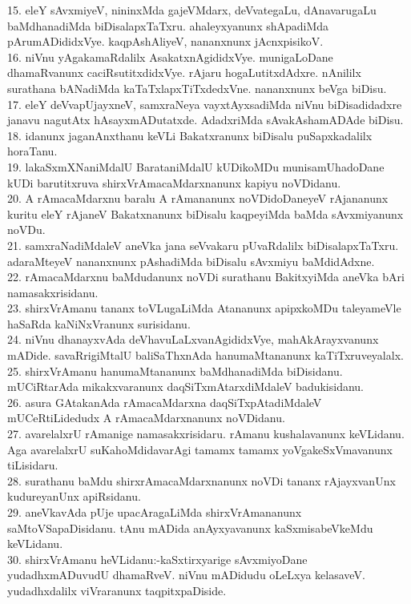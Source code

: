 \documentclass{article}
\begin{document}
15. eleY sAvxmiyeV, nininxMda gajeVMdarx, deVvategaLu, dAnavarugaLu baMdhanadiMda biDisalapxTaTxru. ahaleyxyanunx shApadiMda pArumADididxVye. kaqpAshAliyeV, nananxnunx jAcnxpisikoV.\\
16. niVnu yAgakamaRdalilx AsakatxnAgididxVye. munigaLoDane dhamaRvanunx caciRsutitxdidxVye. rAjaru hogaLutitxdAdxre. nAnililx surathana bANadiMda kaTaTxlapxTiTxdedxVne. nananxnunx beVga biDisu.\\
17. eleY deVvapUjayxneV, samxraNeya vayxtAyxsadiMda niVnu biDisadidadxre janavu nagutAtx hAsayxmADutatxde. AdadxriMda sAvakAshamADAde biDisu.\\
18. idanunx jaganAnxthanu keVLi Bakatxranunx biDisalu puSapxkadalilx horaTanu.\\
19. lakaSxmXNaniMdalU BarataniMdalU kUDikoMDu munisamUhadoDane kUDi barutitxruva shirxVrAmacaMdarxnanunx kapiyu noVDidanu.\\
20. A rAmacaMdarxnu baralu A rAmananunx noVDidoDaneyeV rAjananunx kuritu eleY rAjaneV Bakatxnanunx biDisalu kaqpeyiMda baMda sAvxmiyanunx noVDu.\\
21. samxraNadiMdaleV aneVka jana seVvakaru pUvaRdalilx biDisalapxTaTxru. adaraMteyeV nananxnunx pAshadiMda biDisalu sAvxmiyu baMdidAdxne.\\
22. rAmacaMdarxnu baMdudanunx noVDi surathanu BakitxyiMda aneVka bAri namasakxrisidanu.\\
23. shirxVrAmanu tananx toVLugaLiMda Atananunx apipxkoMDu taleyameVle haSaRda kaNiNxVranunx surisidanu.\\
24. niVnu dhanayxvAda deVhavuLaLxvanAgididxVye, mahAkArayxvanunx mADide. savaRrigiMtalU baliSaThxnAda hanumaMtananunx kaTiTxruveyalalx.\\
25. shirxVrAmanu hanumaMtananunx baMdhanadiMda biDisidanu. mUCiRtarAda mikakxvaranunx daqSiTxmAtarxdiMdaleV badukisidanu.\\
26. asura GAtakanAda rAmacaMdarxna daqSiTxpAtadiMdaleV mUCeRtiLidedudx A rAmacaMdarxnanunx noVDidanu.\\
27. avarelalxrU rAmanige namasakxrisidaru. rAmanu kushalavanunx keVLidanu. Aga avarelalxrU suKahoMdidavarAgi tamamx tamamx yoVgakeSxVmavanunx tiLisidaru.\\
28. surathanu baMdu shirxrAmacaMdarxnanunx noVDi tananx rAjayxvanUnx kudureyanUnx apiRsidanu.\\
29. aneVkavAda pUje upacAragaLiMda shirxVrAmananunx saMtoVSapaDisidanu. tAnu mADida anAyxyavanunx kaSxmisabeVkeMdu keVLidanu.\\
30. shirxVrAmanu heVLidanu:-kaSxtirxyarige sAvxmiyoDane yudadhxmADuvudU dhamaRveV. niVnu mADidudu oLeLxya kelasaveV. yudadhxdalilx viVraranunx taqpitxpaDiside.\\
\end{document}
